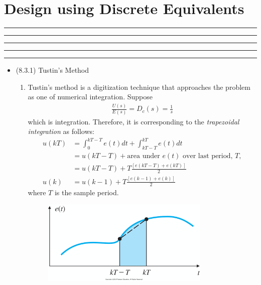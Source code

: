 \setcounter{chapter}{7}
\setcounter{section}{2}
\section{Design using Discrete Equivalents}
\vspace{-8pt} \hrule \hrule \hrule \hrule \hrule  \vspace{12pt}
\begin{itemize}
\item (8.3.1) Tustin's Method
	\begin{enumerate}
		\item Tustin's method is a digitization technique that approaches the problem as one of numerical integration. Suppose 
		\begin{align*}
			\frac{U(s)}{E(s)}  = D_c(s) = \frac{1}{s} 
		\end{align*}
		which is integration. Therefore, it is corresponding to the \emph{trapezoidal integration} as follows:
		\begin{align*}
			u(kT) &= \int_{0}^{kT-T} e(t) dt + \int_{kT -T}^{kT} e(t) dt \\
			&= u(kT-T) + \mbox{area under $e(t)$ over last period, $T$},  \\
			&= u(kT-T) + T \frac{[e(kT-T)+e(kT)]}{2}\\
			u(k) &= u(k-1) + T \frac{[e(k-1)+e(k)]}{2}
		\end{align*}
		where $T$ is the sample period. 
		\begin{figure}[h] 
		    \centering
			\includegraphics[width=8cm]{./FIG_Franklin/fig8-7.png}
		\end{figure}
		
	\end{enumerate}

\end{itemize}		